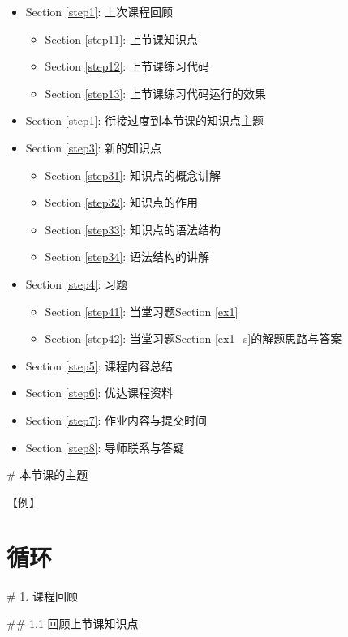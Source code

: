 \documentclass[11pt]{article}
\providecommand{\tightlist}{%
      \setlength{\itemsep}{0pt}\setlength{\parskip}{0pt}}
\begin{document}
\begin{itemize}
\item
  Section \ref{step1}: 上次课程回顾

  \begin{itemize}
  \tightlist
  \item
    Section \ref{step11}: 上节课知识点
  \item
    Section \ref{step12}: 上节课练习代码
  \item
    Section \ref{step13}: 上节课练习代码运行的效果
  \end{itemize}
\item
  Section \ref{step1}: 衔接过度到本节课的知识点主题
\item
  Section \ref{step3}: 新的知识点

  \begin{itemize}
  \tightlist
  \item
    Section \ref{step31}: 知识点的概念讲解
  \item
    Section \ref{step32}: 知识点的作用
  \item
    Section \ref{step33}: 知识点的语法结构
  \item
    Section \ref{step34}: 语法结构的讲解
  \end{itemize}
\item
  Section \ref{step4}: 习题

  \begin{itemize}
  \tightlist
  \item
    Section \ref{step41}: 当堂习题Section \ref{ex1}
  \item
    Section \ref{step42}: 当堂习题Section \ref{ex1_s}的解题思路与答案
  \end{itemize}
\item
  Section \ref{step5}: 课程内容总结
\item
  Section \ref{step6}: 优达课程资料
\item
  Section \ref{step7}: 作业内容与提交时间
\item
  Section \ref{step8}: 导师联系与答疑
\end{itemize}

     \# 本节课的主题

    【例】

\section{循环}\label{ux5faaux73af}

     \# 1. 课程回顾

     \#\# 1.1 回顾上节课知识点
\end{document}
